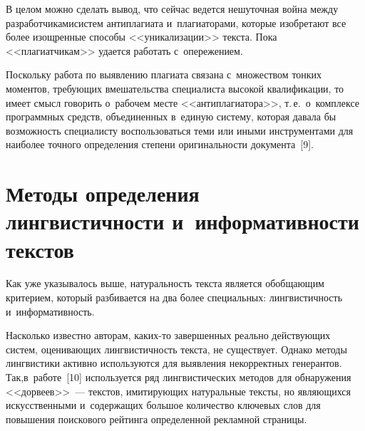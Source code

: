 \begin{multicols}{2}
   В целом можно сделать вывод, что сейчас ве\-дется нешуточная война
между разработчиками\linebreak сис\-тем антиплагиата и~плагиаторами, которые
изобретают все более изощренные способы <<уникализации>> текста. Пока
<<плагиатчикам>> удается работать с~опережением.

   Поскольку работа по выявлению плагиата связана с~множеством тонких
моментов, требующих вмешательства специалиста высокой квалификации,
то имеет смысл говорить о~рабочем месте <<антиплагиатора>>, т.\,е.\
о~комплексе программных средств, объединенных в~единую систему,
которая давала бы возможность специалисту воспользоваться теми или
иными инструментами для наиболее точного определения степени
оригинальности документа~[9].


\section{Методы определения лингвистичности
и~информативности текстов}

   Как уже указывалось выше, натуральность текста является обобщающим
критерием, который разбивается на два более специальных: лингвистичность
и~информативность.

   Насколько известно авторам, ка\-ких-то завершенных реально
действующих систем, оценива\-ющих лингвистичность текста, не существует.
Однако методы лингвистики активно используются для выявления
некорректных генерантов. Так,\linebreak в~работе~[10] используется ряд
лингвистических методов для обнаружения <<дорвеев>>~--- текстов,
имитирующих натуральные тексты, но являющихся искусственными
и~содержащих большое количество ключевых слов для повышения
поискового рейтинга определенной рекламной страницы.


\end{multicols}
